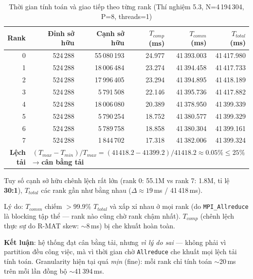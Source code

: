 \begin{table}[h]
\centering
\caption{Thời gian tính toán và giao tiếp theo từng rank (Thí nghiệm 5.3,
         N=4\,194\,304, P=8, threads=1)}
\label{tab:granular}
\begin{tabular}{rrrrrr}
\hline
\textbf{Rank} &
\textbf{Đỉnh sở hữu} &
\textbf{Cạnh sở hữu} &
\textbf{$T_{comp}$ (ms)} &
\textbf{$T_{comm}$ (ms)} &
\textbf{$T_{total}$ (ms)} \\
\hline
0 & 524\,288 & 55\,080\,193 & 24.977 & 41\,393.003 & 41\,417.980 \\
1 & 524\,288 & 18\,006\,484 & 23.274 & 41\,394.458 & 41\,417.733 \\
2 & 524\,288 & 17\,996\,405 & 23.294 & 41\,394.895 & 41\,418.189 \\
3 & 524\,288 &  5\,791\,508 & 22.146 & 41\,395.736 & 41\,417.882 \\
4 & 524\,288 & 18\,006\,080 & 20.389 & 41\,378.950 & 41\,399.339 \\
5 & 524\,288 &  5\,790\,254 & 18.752 & 41\,380.577 & 41\,399.329 \\
6 & 524\,288 &  5\,789\,758 & 18.858 & 41\,380.304 & 41\,399.161 \\
7 & 524\,288 &  1\,844\,702 & 17.318 & 41\,382.006 & 41\,399.324 \\
\hline
\textbf{Lệch tải} & \multicolumn{5}{l}{$(T_{max}-T_{min})/T_{max}
  = (41418.2 - 41399.2)/41418.2 \approx \mathbf{0.05\%} \leq 25\%$
  → \textbf{cân bằng tải}} \\
\hline
\end{tabular}
\begin{tablenotes}
\small
\item Tuy số cạnh sở hữu chênh lệch rất lớn (rank 0: 55.1M vs rank 7: 1.8M,
      tỉ lệ \textbf{30:1}), $T_{total}$ các rank gần như bằng nhau
      ($\Delta \approx 19$\,ms / 41\,418\,ms).
\item Lý do: $T_{comm}$ chiếm $>$99.9\% $T_{total}$ và xấp xỉ nhau ở mọi rank
      (do \texttt{MPI\_Allreduce} là blocking tập thể — rank nào cũng chờ rank chậm nhất).
      $T_{comp}$ (chênh lệch thực sự do R-MAT skew: $\sim$8\,ms) bị che khuất hoàn toàn.
\item \textbf{Kết luận}: hệ thống đạt cân bằng tải, nhưng \emph{vì lý do sai} —
      không phải vì partition đều công việc, mà vì thời gian chờ
      \texttt{Allreduce} che khuất mọi lệch tải tính toán.
      Granularity hiện tại quá \emph{mịn} (fine): mỗi rank chỉ tính toán $\sim$20\,ms
      trên mỗi lần đồng bộ $\sim$41\,394\,ms.
\end{tablenotes}
\end{table}


